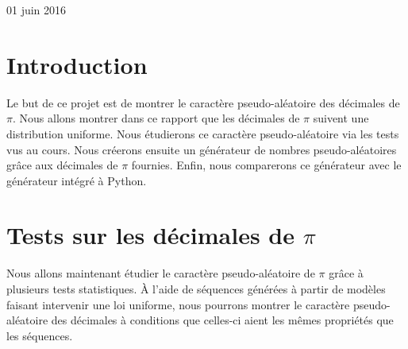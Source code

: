 \documentclass[10pt,a4paper]{article}
\begin{document}
\begin{titlepage}

{\large 01 juin 2016}\\[3cm] %


 

\vfill %

\end{titlepage}

\newpage
\tableofcontents
\newpage

\section{Introduction}
	Le but de ce projet est de montrer le caractère pseudo-aléatoire des décimales de $\pi$. Nous allons montrer dans ce rapport que les 
décimales de $\pi$ suivent une distribution uniforme. Nous étudierons ce caractère pseudo-aléatoire via les tests vus au cours. Nous
créerons ensuite un générateur de nombres pseudo-aléatoires grâce aux décimales de $\pi$ fournies. Enfin, nous comparerons ce générateur
avec le générateur intégré à Python.

\section{Tests sur les décimales de $\pi$}

Nous allons maintenant étudier le caractère pseudo-aléatoire de $\pi$ grâce à plusieurs tests statistiques. \`A l'aide de séquences générées à partir de modèles faisant intervenir une loi uniforme, nous pourrons montrer le caractère pseudo-aléatoire des décimales à conditions que celles-ci aient les mêmes propriétés que les séquences.
\end{document}
